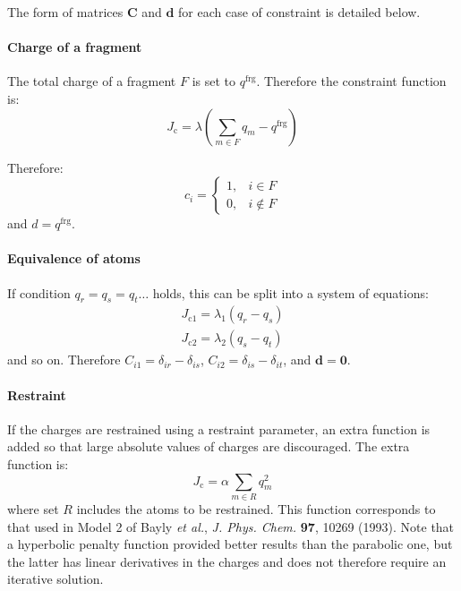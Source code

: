 \documentclass[a4paper]{report}
\newcommand{\bs}{\boldsymbol}
\newcommand{\mr}{\mathrm}
\begin{document}
The form of matrices $\bs{C}$ and $\bs{d}$ for each case of constraint is detailed below.

\paragraph{Charge of a fragment}

The total charge of a fragment $F$ is set to $q^\mathrm{frg}$. Therefore the constraint function is:
\begin{equation}
J_\mr{c} = \lambda\left(\sum_{m\in F} q_m - q^\mathrm{frg} \right) 
\end{equation}

Therefore:
\begin{equation}
  c_i = \left\{\begin{array}{ll}
    1, & i \in F \\
    0, & i \notin F  
    \end{array}\right.
\end{equation}
and $d = q^\mathrm{frg}$.

\paragraph{Equivalence of atoms}

If condition $q_r = q_s = q_t \dots$ holds, this can be split into a system of
equations:
\begin{align}
J_{\mr{c}1} = \lambda_1 \left( q_r - q_s \right) \nonumber \\
J_{\mr{c}2} = \lambda_2 \left( q_s - q_t \right) \nonumber 
\end{align}
and so on. Therefore $C_{i1} = \delta_{ir} - \delta_{is}$, $C_{i2} = \delta_{is} - \delta_{it}$, and $\bs{d} = \bs{0}$.

\paragraph{Restraint}

If the charges are restrained using a restraint parameter, an extra function is added
so that large absolute values of charges are discouraged. The extra function is:
\begin{equation}
J_\mr{c} = \alpha \sum_{m \in R} q_m^2
\end{equation}
where set $R$ includes the atoms to be restrained.
This function corresponds to that used in Model 2 of Bayly \emph{et al.}, \emph{J.
Phys. Chem.} \textbf{97}, 10269 (1993). Note that a hyperbolic penalty function
provided better results than the parabolic one, but the latter has linear derivatives
in the charges and does not therefore require an iterative solution.
\end{document}
